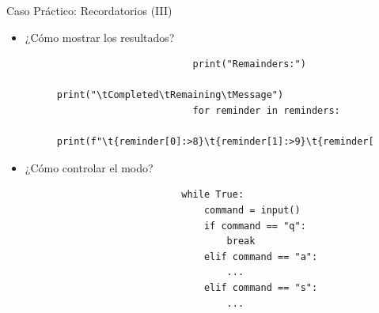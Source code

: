 \documentclass{beamer}
\begin{document}
    \begin{frame}[fragile]{Caso Práctico: Recordatorios (III)}
        \begin{itemize}
          \item ¿Cómo mostrar los resultados?
          \begin{figure}
              \begin{minipage}[c]{0.7\textwidth}
                  \begin{verbatim}
                        print("Remainders:")
                        print("\tCompleted\tRemaining\tMessage")
                        for reminder in reminders:
                            print(f"\t{reminder[0]:>8}\t{reminder[1]:>9}\t{reminder[2]}")
                  \end{verbatim}
              \end{minipage}
          \end{figure}
          \vfill
          \item ¿Cómo controlar el modo?
          \begin{figure}
              \begin{minipage}[c]{0.7\textwidth}
                  \begin{verbatim}
                      while True:
                          command = input()
                          if command == "q":
                              break
                          elif command == "a":
                              ...
                          elif command == "s":
                              ...
                  \end{verbatim}
              \end{minipage}
          \end{figure}
        \end{itemize}
    \end{frame}
\end{document}
